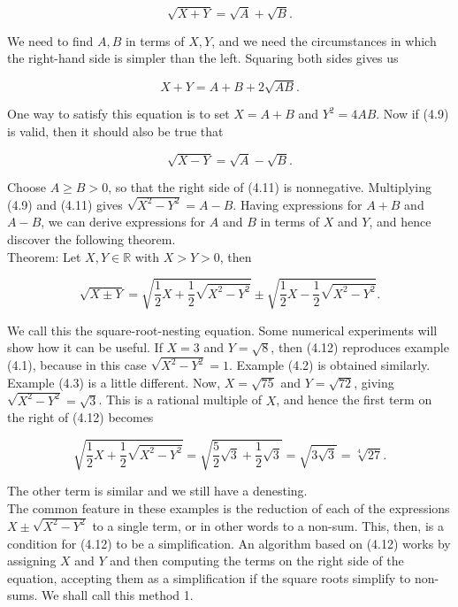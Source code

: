 \documentclass[11pt,letterpaper]{article}
\begin{document}
\begin{equation*}
\sqrt{X+Y}=\sqrt{A}+\sqrt{B} . \tag{4.9}\label{eq:4.9}
\end{equation*}


We need to find $A, B$ in terms of $X, Y$, and we need the circumstances in which the right-hand side is simpler than the left. Squaring both sides gives us


\begin{equation*}
X+Y=A+B+2 \sqrt{A B} . \tag{4.10}\label{eq:4.10}
\end{equation*}


One way to satisfy this equation is to set $X=A+B$ and $Y^{2}=4 A B$. Now if (4.9) is valid, then it should also be true that


\begin{equation*}
\sqrt{X-Y}=\sqrt{A}-\sqrt{B} . \tag{4.11}\label{eq:4.11}
\end{equation*}


Choose $A\geq B>0$, so that the right side of (4.11) is nonnegative. Multiplying (4.9) and (4.11) gives $\sqrt{X^{2}-Y^{2}}=A-B$. Having expressions for $A+B$ and $A-B$, we can derive expressions for $A$ and $B$ in terms of $X$ and $Y$, and hence discover the following theorem.\\
Theorem: Let $X, Y \in \mathbb{R}$ with $X>Y>0$, then


\begin{equation*}
\sqrt{X \pm Y}=\sqrt{\frac{1}{2} X+\frac{1}{2} \sqrt{X^{2}-Y^{2}}} \pm \sqrt{\frac{1}{2} X-\frac{1}{2} \sqrt{X^{2}-Y^{2}}} . \tag{4.12}\label{eq:4.12}
\end{equation*}


We call this the square-root-nesting equation. Some numerical experiments will show how it can be useful. If $X=3$ and $Y=\sqrt{8}$, then (4.12) reproduces example (4.1), because in this case $\sqrt{X^{2}-Y^{2}}=1$. Example (4.2) is obtained similarly. Example (4.3) is a little different. Now, $X=\sqrt{75}$ and $Y=\sqrt{72}$, giving $\sqrt{X^{2}-Y^{2}}=\sqrt{3}$. This is a rational multiple of $X$, and hence the first term on the right of (4.12) becomes

\[
\sqrt{\frac{1}{2} X+\frac{1}{2} \sqrt{X^{2}-Y^{2}}}=\sqrt{\frac{5}{2} \sqrt{3}+\frac{1}{2} \sqrt{3}}=\sqrt{3 \sqrt{3}}=\sqrt[4]{27} .
\]

The other term is similar and we still have a denesting.\\
The common feature in these examples is the reduction of each of the expressions $X \pm \sqrt{X^{2}-Y^{2}}$ to a single term, or in other words to a non-sum. This, then, is a condition for (4.12) to be a simplification. An algorithm based on (4.12) works by assigning $X$ and $Y$ and then computing the terms on the right side of the equation, accepting them as a simplification if the square roots simplify to non-sums. We shall call this method 1.
\end{document}
